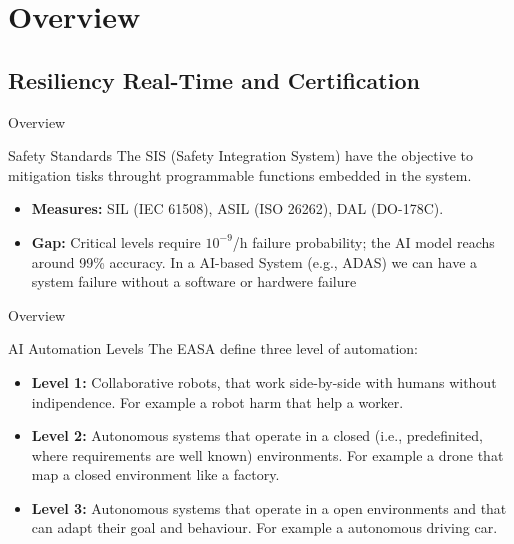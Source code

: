 \section{Overview}

\subsection{Resiliency Real-Time and Certification}

\begin{frame}{Overview}
    \begin{block}{Safety Standards}
        The SIS (Safety Integration System) have the objective to mitigation tisks throught programmable functions embedded in the system.
        \begin{itemize}
            \item \textbf{Measures:} SIL (IEC 61508), ASIL (ISO 26262), DAL (DO-178C).
            \item \textbf{Gap:} Critical levels require $10^{-9}$/h failure probability; the AI model reachs around 99\% accuracy. In a AI-based System (e.g., ADAS) we can have a system failure without a software or hardwere failure
        \end{itemize}
    \end{block}
\end{frame}

\begin{frame}{Overview}
    \begin{block}{AI Automation Levels}
        The EASA define three level of automation:
        \begin{itemize}
            \item \textbf{Level 1:} Collaborative robots, that work side-by-side with humans without indipendence. For example a robot harm that help a worker.
            \item \textbf{Level 2:} Autonomous systems that operate in a closed (i.e., predefinited, where requirements are well known) environments. For example a drone that map a closed environment like a factory.
            \item \textbf{Level 3:} Autonomous systems that operate in a open environments and that can adapt their goal and behaviour. For example a autonomous driving car.
        \end{itemize}
    \end{block}
\end{frame}

